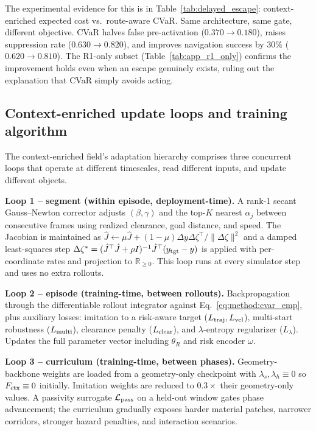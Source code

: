 The experimental evidence for this is in Table~\ref{tab:delayed_escape}:
context-enriched expected cost vs.\ route-aware CVaR.
Same architecture, same gate, different objective.
CVaR halves false pre-activation ($0.370\to0.180$), raises suppression
rate ($0.630\to0.820$), and improves navigation success by $30\%$
($0.620\to0.810$).
The R1-only subset (Table~\ref{tab:app_r1_only}) confirms the improvement
holds even when an escape genuinely exists, ruling out the explanation
that CVaR simply avoids acting.

\subsection{Context-enriched update loops and training algorithm}
\label{app:ctx_loops_hierarchy}

The context-enriched field's adaptation hierarchy comprises three concurrent loops that 
operate at different timescales, read different inputs, and update 
different objects.

\textbf{Loop 1 -- segment (within episode, deployment-time).}
A rank-1 secant Gauss--Newton corrector adjusts $(\beta,\gamma)$ and 
the top-$K$ nearest $\alpha_j$ between consecutive frames using realized 
clearance, goal distance, and speed. The Jacobian is maintained as 
$\hat J \leftarrow \mu\hat J + (1{-}\mu)\Delta y\Delta\zeta^\top/
\|\Delta\zeta\|^2$ and a damped least-squares step 
$\Delta\zeta^* = (\hat J^\top\hat J + \rho I)^{-1}\hat J^\top
(y_{\rm tgt}-y)$ is applied with per-coordinate rates and projection to 
$\mathbb{R}_{\ge0}$. This loop runs at every simulator step and uses 
no extra rollouts.

\textbf{Loop 2 -- episode (training-time, between rollouts).}
Backpropagation through the differentiable rollout integrator against 
Eq.~\eqref{eq:method:cvar_emp}, plus auxiliary losses: imitation to a risk-aware 
target ($L_{\rm traj}, L_{\rm vel}$), multi-start robustness 
($L_{\rm multi}$), clearance penalty ($L_{\rm clear}$), 
and $\lambda$-entropy regularizer ($L_\lambda$). Updates the full 
parameter vector including $\theta_R$ and risk encoder $\omega$.

\textbf{Loop 3 -- curriculum (training-time, between phases).}
Geometry-backbone weights are loaded from a geometry-only checkpoint with 
$\lambda_s, \lambda_h \equiv 0$ so $F_{\rm ctx} \equiv 0$ initially. 
Imitation weights are reduced to $0.3\times$ their geometry-only values. 
A passivity surrogate $\mathcal{L}_{\rm pass}$ on a held-out window 
gates phase advancement; the curriculum gradually exposes harder 
material patches, narrower corridors, stronger hazard penalties, and 
interaction scenarios.


